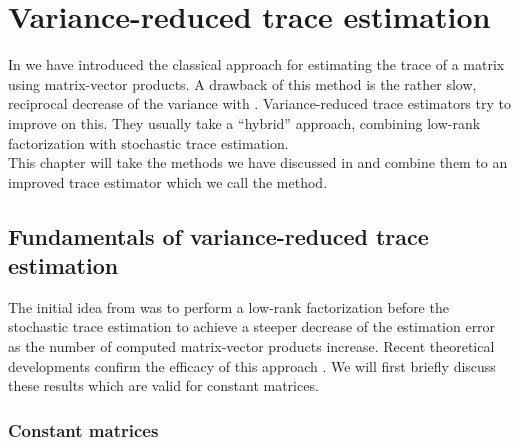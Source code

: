 \chapter{Variance-reduced trace estimation}
\label{chp:4-nystromchebyshev}

In  we have introduced the
classical approach for estimating the trace of a matrix using matrix-vector
products. A drawback of this method is the rather slow, reciprocal decrease of
the variance with . Variance-reduced trace estimators
try to improve on this. They usually take a \enquote{hybrid} approach, combining
low-rank factorization with stochastic trace estimation.\\

This chapter will take the methods we have discussed in 
and  combine them to an improved trace estimator which
we call the  method.


\section{Fundamentals of variance-reduced trace estimation}
\label{sec:4-nystromchebyshev-hybrid}

The initial idea from \cite{lin2017randomized} was to perform a low-rank
factorization before the stochastic trace estimation to achieve a
steeper decrease of the estimation error as the number of computed
matrix-vector products increase. Recent theoretical developments confirm the
efficacy of this approach \cite{meyer2021hutch,persson2022hutch}.
We will first briefly discuss these results which are valid 
for constant matrices.\\

\subsection{Constant matrices}
\label{subsec:4-nystromchebyshev-reduction-constant-matrices}

